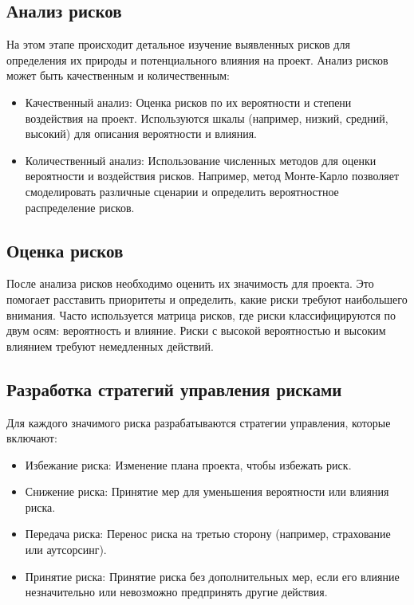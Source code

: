     \subsection*{Анализ рисков}
    На этом этапе происходит детальное изучение выявленных рисков для определения их природы и потенциального влияния на проект. Анализ рисков может быть качественным и количественным:

    \begin{itemize}
        \item Качественный анализ: Оценка рисков по их вероятности и степени воздействия на проект. Используются шкалы (например, низкий, средний, высокий) для описания вероятности и влияния.
        \item Количественный анализ: Использование численных методов для оценки вероятности и воздействия рисков. Например, метод Монте-Карло позволяет смоделировать различные сценарии и определить вероятностное распределение рисков.
    \end{itemize}

    \subsection*{Оценка рисков}
    После анализа рисков необходимо оценить их значимость для проекта. Это помогает расставить приоритеты и определить, какие риски требуют наибольшего внимания. Часто используется матрица рисков, где риски классифицируются по двум осям: вероятность и влияние. Риски с высокой вероятностью и высоким влиянием требуют немедленных действий.
    
    \subsection*{Разработка стратегий управления рисками}
    Для каждого значимого риска разрабатываются стратегии управления, которые включают:

    \begin{itemize}
        \item Избежание риска: Изменение плана проекта, чтобы избежать риск.
        \item Снижение риска: Принятие мер для уменьшения вероятности или влияния риска.
        \item Передача риска: Перенос риска на третью сторону (например, страхование или аутсорсинг).
        \item Принятие риска: Принятие риска без дополнительных мер, если его влияние незначительно или невозможно предпринять другие действия.
    \end{itemize}
    
